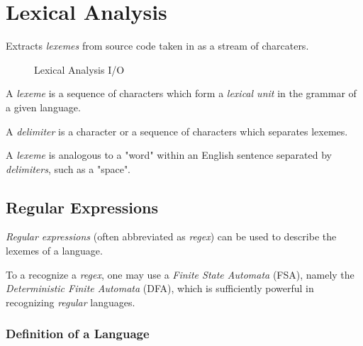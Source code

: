 \section{Lexical Analysis}

Extracts \textit{lexemes} from source code taken in as a stream of charcaters.

\begin{figure}[H]
    \centering
    \caption{Lexical Analysis I/O}
    \label{fig:lexical-analysis-io}
\end{figure}

\begin{definition}[Lexeme]
    A \textit{lexeme} is a sequence of characters which form a \textit{lexical unit} in the grammar of a given language.
\end{definition}

\begin{definition}[Delimiter]
    A \textit{delimiter} is a character or a sequence of characters which separates lexemes.
\end{definition}

\begin{remark}
    A \textit{lexeme} is analogous to a "word" within an English sentence separated by \textit{delimiters}, such as a "space".
\end{remark}

\subsection{Regular Expressions}

\textit{Regular expressions} (often abbreviated as \textit{regex}) can be used to describe the lexemes of a language.

To a recognize a \textit{regex}, one may use a \textit{Finite State Automata} (FSA), namely the \textit{Deterministic Finite Automata} (DFA), which is sufficiently powerful in recognizing \textit{regular} languages.

\subsubsection{Definition of a Language}

